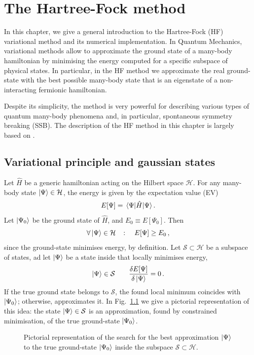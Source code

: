  \def\GraphicsFolder{chapters/hf-introduction/pictures}

\chapter{The Hartree-Fock method}\label{chap:hf}

In this chapter, we give a general introduction to the Hartree-Fock (HF) variational method and its numerical implementation. In Quantum Mechanics, variational methods allow to approximate the ground state of a many-body hamiltonian by minimising the energy computed for a specific subspace of physical states. In particular, in the HF method we approximate the real ground-state with the best possible many-body state that is an eigenstate of a non-interacting fermionic hamiltonian.

Despite its simplicity, the method is very powerful for describing various types of quantum many-body phenomena and, in particular, spontaneous symmetry breaking (SSB). The description of the HF method in this chapter is largely based on \cite{grosso2014solid, fabrizio2022course}.

\section{Variational principle and gaussian states}

Let $\hat H$ be a generic hamiltonian acting on the Hilbert space $\mathcal{H}$. For any many-body state $\ket{\Psi} \in \mathcal{H}$, the energy is given by the expectation value (EV)
\[
	E[\Psi] = \mel{\Psi}{\hat H}{\Psi}.
\]
Let $\ket{\Psi_0}$ be the ground state of $\hat H$, and $E_0 \equiv E[\Psi_0]$. Then
\[
	\forall \ket{\Psi} \in \mathcal{H}
	\quad\colon\quad
	E[\Psi] \ge E_0 \, ,
\]
since the ground-state minimises energy, by definition. Let $\mathcal{S} \subset \mathcal{H}$ be a subspace of states, ad let $\ket{\Psi}$ be a state inside that locally minimises energy,
\[
	\ket{\Psi} \in \mathcal{S}
	\qquad
	\fdv{E[\Psi]}{\ket{\Psi}} = 0 \, .
\]
If the true ground state belongs to $\mathcal{S}$, the found local minimum coincides with $\ket{\Psi_0}$; otherwise, approximates it. In Fig.~\ref{fig:gaussian-subspace} we give a pictorial representation of this idea: the state $\ket{\Psi}\in\mathcal{S}$ is an approximation, found by constrained minimisation, of the true ground-state $\ket{\Psi_0}$.

\begin{figure}
	\centering
	
	\caption{Pictorial representation of the search for the best approximation $\ket{\Psi}$ to the true ground-state $\ket{\Psi_0}$ inside the subspace $\mathcal{S}\subset\mathcal{H}$.}
	\label{fig:gaussian-subspace}
\end{figure}

